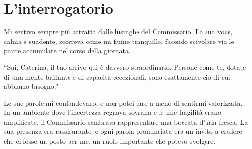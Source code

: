 \section{L'interrogatorio}
\begin{center}
\begin{minipage}{0.7\textwidth}
    \centering
\end{minipage}
\end{center}
Mi sentivo sempre più attratta dalle lusinghe del Commissario. La sua voce, calma e suadente, scorreva come un fiume tranquillo, facendo scivolare via le paure accumulate nel corso della giornata.

\begin{dialogue}
 \enquote{Sai, Caterina, il tuo arrivo qui è davvero straordinario. Persone come te, dotate di una mente brillante e di capacità eccezionali, sono esattamente ciò di cui abbiamo bisogno.}
\end{dialogue}

Le sue parole mi confondevano, e non potei fare a meno di sentirmi valorizzata. In un ambiente dove l'incertezza regnava sovrana e le mie fragilità erano amplificate, il Commissario sembrava rappresentare una boccata d'aria fresca. La sua presenza era rassicurante, e ogni parola pronunciata era un invito a credere che ci fosse un posto per me, un ruolo importante che potevo svolgere.

